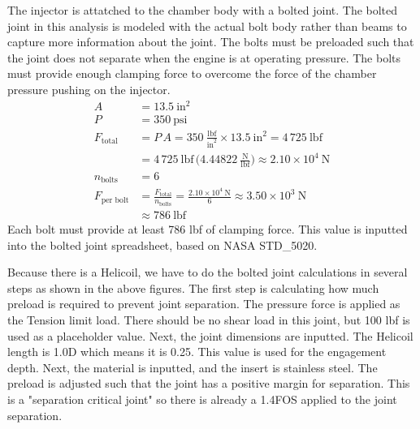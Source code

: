 The injector is attatched to the chamber body with a bolted joint. The bolted joint in this analysis is modeled with the actual bolt body rather than beams to capture more information about the joint. The bolts must be preloaded such that the joint does not separate when the engine is at operating pressure. The bolts must provide enough clamping force to overcome the force of the chamber pressure pushing on the injector. 
\begin{align}
A            &= 13.5~\text{in}^2 \\[2pt]
P            &= 350~\text{psi}                                          \\[6pt]
F_{\text{total}}
             &= P \, A
               = 350~
               \frac{\text{lbf}}{\text{in}^2}
               \times 13.5~\text{in}^2
               = 4\,725~\text{lbf}                                       \\[2pt]
             &= 4\,725~\text{lbf}\,
                \bigl(4.44822~\tfrac{\text{N}}{\text{lbf}}\bigr)
               \approx 2.10\times10^{4}~\text{N}                         \\[12pt]
n_{\text{bolts}}
             &= 6                                                      \\[6pt]
F_{\text{per~bolt}}
             &= \frac{F_{\text{total}}}{n_{\text{bolts}}}
               = \frac{2.10\times10^{4}~\text{N}}{6}
               \approx 3.50\times10^{3}~\text{N}                        \\[2pt]
             &\approx 786~\text{lbf}
\end{align}
Each bolt must provide at least 786 lbf of clamping force. This value is inputted into the bolted joint spreadsheet, based on NASA STD\_5020. 

Because there is a Helicoil, we have to do the bolted joint calculations in several steps as shown in the above figures. The first step is calculating how much preload is required to prevent joint separation. The pressure force is applied as the Tension limit load. There should be no shear load in this joint, but 100 lbf is used as a placeholder value. Next, the joint dimensions are inputted. The Helicoil length is 1.0D which means it is 0.25. This value is used for the engagement depth. Next, the material is inputted, and the insert is stainless steel. The preload is adjusted such that the joint has a positive margin for separation. This is a "separation critical joint" so there is already a 1.4FOS applied to the joint separation. 

